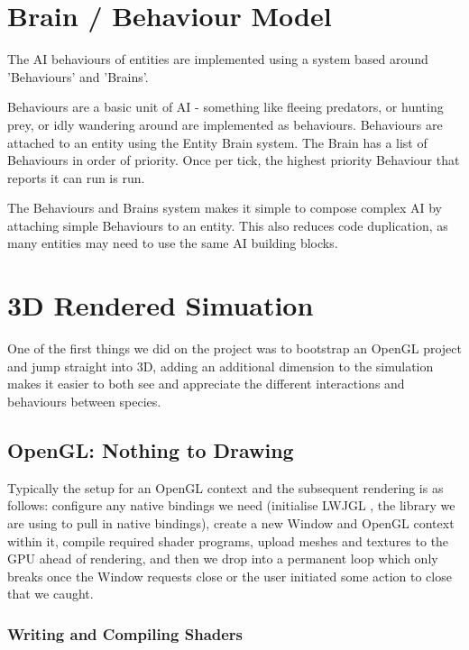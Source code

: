 \documentclass{article}
\begin{document}
\begin{multicols}{2}
        \section{Brain / Behaviour Model}

        The AI behaviours of entities are implemented using a system based around 'Behaviours' and 'Brains'.
        
        Behaviours are a basic unit of AI - something like fleeing predators, or hunting prey, or idly wandering around are implemented as behaviours. Behaviours are attached to an entity using the Entity Brain system. The Brain has a list of Behaviours in order of priority. Once per tick, the highest priority Behaviour that reports it can run is run.
        
        The Behaviours and Brains system makes it simple to compose complex AI by attaching simple Behaviours to an entity. This also reduces code duplication, as many entities may need to use the same AI building blocks.

        \section{3D Rendered Simuation}

            One of the first things we did on the project was to bootstrap an OpenGL project and jump straight into 3D, adding an additional dimension to the simulation makes it easier to both see and appreciate the different interactions and behaviours between species.

            \subsection{OpenGL: Nothing to Drawing}

                Typically the setup for an OpenGL context and the subsequent rendering is as follows: configure any native bindings we need (initialise LWJGL \cite{LWJGL}, the library we are using to pull in native bindings), create a new Window and OpenGL context within it, compile required shader programs, upload meshes and textures to the GPU ahead of rendering, and then we drop into a permanent loop which only breaks once the Window requests close or the user initiated some action to close that we caught.

                \subsubsection{Writing and Compiling Shaders}


\end{multicols}
\end{document}

